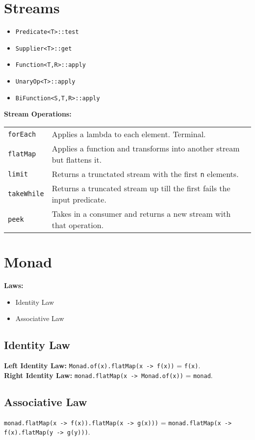 \documentclass[10pt,landscape,a4paper]{article}
\begin{document}
\begin{multicols*}{4}
\section{Streams}
\begin{itemize}
    \item \texttt{Predicate<T>::test}
    \item \texttt{Supplier<T>::get}
    \item \texttt{Function<T,R>::apply}
    \item \texttt{UnaryOp<T>::apply}
    \item \texttt{BiFunction<S,T,R>::apply}
\end{itemize}
\textbf{Stream Operations:} \\
\begin{tabular}{p{1.5cm}p{4.8cm}}
    \verb!forEach!  &   Applies a lambda to each element. Terminal. \\
    \verb!flatMap!  &   Applies a function and transforms into another stream but flattens it.  \\
    \verb!limit!    &   Returns a trunctated stream with the first \texttt{n} elements. \\
    \verb!takeWhile!    &   Returns a truncated stream up till the first fails the input predicate. \\
    \verb!peek!     &   Takes in a consumer and returns a new stream with that operation. \\
\end{tabular}

\section{Monad}
\textbf{Laws:}
\begin{itemize}
    \item Identity Law
    \item Associative Law
\end{itemize}

\subsection{Identity Law}
\textbf{Left Identity Law:} \texttt{Monad.of(x).flatMap(x -> f(x))} = \texttt{f(x)}. \\
\textbf{Right Identity Law:} \texttt{monad.flatMap(x -> Monad.of(x))} = \texttt{monad}.

\subsection{Associative Law}
\texttt{monad.flatMap(x -> f(x)).flatMap(x -> g(x)))} = \texttt{monad.flatMap(x -> f(x).flatMap(y -> g(y)))}.


\end{multicols*}
\end{document}
